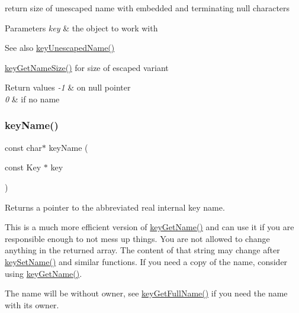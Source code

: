 return size of unescaped name with embedded and terminating null characters 


\begin{DoxyParams}{Parameters}
{\em key} & the object to work with\\
\hline
\end{DoxyParams}
\begin{DoxySeeAlso}{See also}
\mbox{\hyperlink{group__keyname_ga6fe6af4c27b35d911a533f4ae4d698bb}{key\+Unescaped\+Name()}} 

\mbox{\hyperlink{group__keyname_gabdbcfa51ed8a387e47ead207affa2d2e}{key\+Get\+Name\+Size()}} for size of escaped variant 
\end{DoxySeeAlso}

\begin{DoxyRetVals}{Return values}
{\em -\/1} & on null pointer \\
\hline
{\em 0} & if no name \\
\hline
\end{DoxyRetVals}
\mbox{\label{group__keyname_ga8e805c726a60da921d3736cda7813513}} 
\subsubsection{\texorpdfstring{keyName()}{keyName()}}
{\footnotesize\ttfamily const char$\ast$ key\+Name (\begin{DoxyParamCaption}\item[{const Key $\ast$}]{key }\end{DoxyParamCaption})}



Returns a pointer to the abbreviated real internal {\ttfamily key} name. 

This is a much more efficient version of \mbox{\hyperlink{group__keyname_gab29a850168d9b31c9529e90cf9ab68be}{key\+Get\+Name()}} and can use it if you are responsible enough to not mess up things. You are not allowed to change anything in the returned array. The content of that string may change after \mbox{\hyperlink{group__keyname_ga7699091610e7f3f43d2949514a4b35d9}{key\+Set\+Name()}} and similar functions. If you need a copy of the name, consider using \mbox{\hyperlink{group__keyname_gab29a850168d9b31c9529e90cf9ab68be}{key\+Get\+Name()}}.

The name will be without owner, see \mbox{\hyperlink{group__keyname_gaaba1494a5ffc976e0e56c43f4334a23c}{key\+Get\+Full\+Name()}} if you need the name with its owner.


